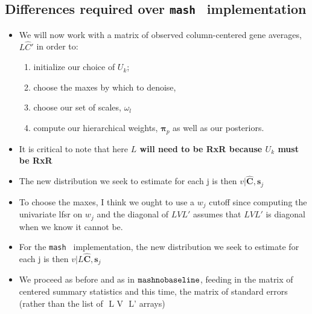 \documentclass[11pt, oneside]{article}   	%
\newcommand{\chat}{\bm{\hat{C}}}
\def\lstar{\text{ L}}
\def\mash{{\tt mash }}
\def\mnb{{\tt mashnobaseline }}
\begin{document}
{\begin{itemize}
\section{Differences required over \mash{} implementation}

\begin{itemize}
\item We will now work with a matrix of observed column-centered gene averages, $L \hat{C} '$ in order to:
\begin{enumerate}
	\item initialize our choice of $U_{k}$;
	\item  choose the maxes by which to denoise, 
	\item choose our set of scales, $\omega_{l}$
	\item compute our hierarchical weights, $\bm{\pi}_{p}$ as well as our posteriors. 
\end{enumerate}
\item It is critical to note that here \textbf{$L$ will need to be RxR because $U_{k}$ must be RxR}
\item The new distribution we seek to estimate for each j is then $v | $\lstar$ \chat , \bm{s}_{j}$
\item To choose the maxes, I think we ought to use a $w_{j}$ cutoff since computing the univariate lfsr on $w_{j}$ and the diagonal of $LVL'$ assumes that $LVL'$ is diagonal when we know it cannot be.
\item For the \mash{} implementation, the new distribution we seek to estimate for each j is then $v | L \chat , \bm{s}_{j}$
\item We proceed as before and as in $\mnb$, feeding in the matrix of centered summary statistics and this time, the matrix of standard errors (rather than the list of $\lstar$ V $\lstar$' arrays)

\end{itemize}


\end{itemize}}
\end{document}
